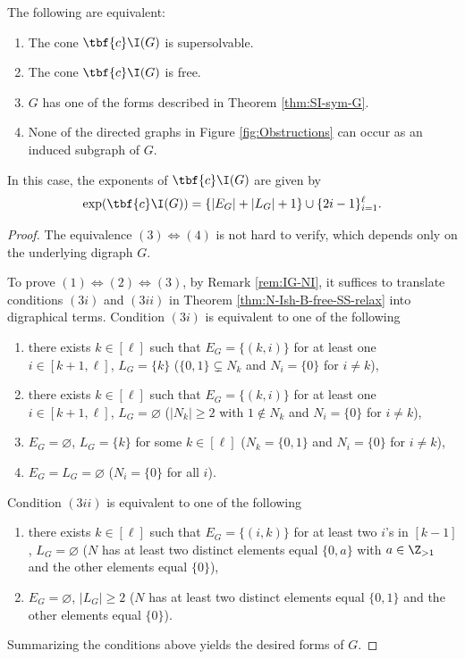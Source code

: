    \begin{theorem}
 \label{thm:IG}
The following are equivalent:
 \begin{enumerate}[(1)]
\item  The cone $\tbf{c}\I(G)$ is supersolvable.
\item The cone $\tbf{c}\I(G)$  is  free.
\item $G$ has one of the forms described in Theorem  \ref{thm:SI-sym-G}.
\item None of the directed graphs in Figure \ref{fig:Obstructions} can occur as an induced subgraph of $G$.
\end{enumerate}
In this case, the exponents of   $\tbf{c}\I(G)$ are   given by 
$$ \exp(\tbf{c}\I(G)) = \{|E_G|+|L_G|+1\} \cup \{2i-1\}_{i=1}^\ell.$$
 \end{theorem}
 
 \begin{proof}
 The equivalence $(3) \Leftrightarrow (4)$ is not hard to verify, which depends only on the underlying digraph $G$. 
 
 To prove $(1) \Leftrightarrow (2) \Leftrightarrow (3)$, by Remark \ref{rem:IG-NI}, it suffices to translate conditions $(3i)$ and $(3ii)$ in Theorem \ref{thm:N-Ish-B-free-SS-relax} into digraphical terms. 
Condition $(3i)$ is equivalent to one of the following 
 \begin{enumerate}
 \item[$(a')$]  there exists $k\in[\ell]$ such that $E_G=\{(k,i)  \}$ for at least one $i \in [k+1,\ell]$, $L_G =\{k\}$ ($ \{0,1\} \subsetneq N_k$ and $N_i = \{0\}$ for $i\ne k$), 
\item[$(a'')$]   there exists $k\in[\ell]$ such that $E_G=\{(k,i)  \}$ for at least one $i \in [k+1,\ell]$, $L_G =\varnothing$ ($|N_k|\ge 2$ with $1 \notin N_k$  and $N_i = \{0\}$ for $i\ne k$),
\item[$(c')$] $E_G=\varnothing$, $L_G =\{k\}$ for some $k\in[\ell]$ ($N_k = \{0,1\}$ and $N_i = \{0\}$ for $i\ne k$),  
\item[$(c'')$] $E_G=L_G =\varnothing$ ($N_i = \{0\}$ for all $i$). 
\end{enumerate}
Condition $(3ii)$ is equivalent to one of the following
 \begin{enumerate}
 \item[$(b)$]  there exists $k\in[\ell]$ such that $E_G=\{(i,k) \}$ for at least two $i$'s in $[k-1]$, $L_G =\varnothing$ 
 ($N$ has at least two distinct elements equal $\{0,a\}$ with $a \in\Z_{>1}$ and the other elements equal $\{0\}$), 
\item[$(c''')$] $E_G=\varnothing$, $|L_G|\ge2$  ($N$ has at least two distinct elements equal $\{0,1\}$  and the other elements equal $\{0\}$). 
\end{enumerate}
Summarizing the conditions above yields the desired forms of $G$.
\end{proof}


